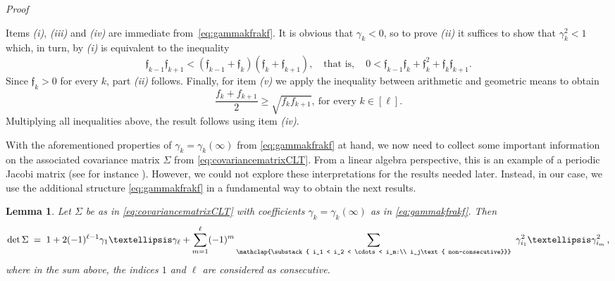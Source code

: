 \documentclass[reqno,a4paper,11pt]{amsart}
\makeatletter
\newtheorem{lemma}{Lemma}
\theoremstyle{remark}
\newcommand{\mf}[1]{{\mathfrak #1}}
\newcommand{\f}{{\mf f}}
\numberwithin{equation}{section}
\renewenvironment{proof}[1][Proof]{\par
\pushQED{\qed}%
\normalfont \topsep6\p@\@plus6\p@\relax
\trivlist
\item\relax
{\itshape
#1\@addpunct{.}}\hspace\labelsep\ignorespaces
}{%
\popQED\endtrivlist\@endpefalse
}
\makeatother
\begin{document}
\begin{proof}
Items \textit{(i)}, \textit{(iii)} and \textit{(iv)} are immediate
from~\eqref{eq:gammakfrakf}. It is obvious that $\gamma_k<0$, so to prove \textit{(ii)} it suffices to show that $\gamma_k^2<1$ which, in turn, by {\it (i)} is equivalent to the inequality
\begin{equation*}
\f_{k-1}\f_{k+1}<(\f_{k-1}+\f_k)(\f_{k}+\f_{k+1}),\quad \text{that is}, \quad 0<\f_{k-1}\f_k+\f_k^2+\f_k\f_{k+1}.
\end{equation*}
Since $\f_k>0$ for every $k$, part \textit{(ii)} follows.
Finally, for item \textit{(v)} we apply the  inequality between arithmetic and geometric means to obtain
\begin{equation*}
\frac{f_k + f_{k+1}}{2} \ge \sqrt{f_k f_{k+1}},\
    \text{for every }k \in [\ell].
\end{equation*}
Multiplying all inequalities above, the result follows using
item \textit{(iv)}.
\end{proof}

With the aforementioned properties of $\gamma_k=\gamma_k(\infty)$ from \eqref{eq:gammakfrakf} at hand, we now need to collect some important information on the associated covariance matrix $\Sigma$ from \eqref{eq:covariancematrixCLT}. From a linear algebra perspective, this is an example of a periodic Jacobi matrix (see for instance \cite{vanMoerbekeJac, molinari2008determinants, FergusonWarren}). However, we could not explore these interpretations for the results needed later. Instead, in our case, we use the additional structure \eqref{eq:gammakfrakf} in a fundamental way to obtain the next results.

\begin{lemma}
\label{lema:det_Sigma_expression}
Let $\Sigma$ be as in \eqref{eq:covariancematrixCLT} with coefficients $\gamma_k=\gamma_k(\infty)$ as in \eqref{eq:gammakfrakf}. Then
\begin{equation}
\label{eq:det_Sigma_expression}
\det \Sigma
    \;=\; 1 + 2 (-1)^{\ell-1} \gamma_{1} \ldots \gamma_{\ell} + \sum_{m=1}^{\ell}
    (-1)^{m} \sum_{\mathclap{\substack{ i_1 < i_2 < \cdots < i_m:\\
    i_j\text{ non-consecutive}}}}
        \ \gamma_{i_1}^2 \ldots \gamma_{i_m}^2\,,
\end{equation}
%
where in the sum above, the indices $1$ and $\ell$ are considered as consecutive.
\end{lemma}
\end{document}

